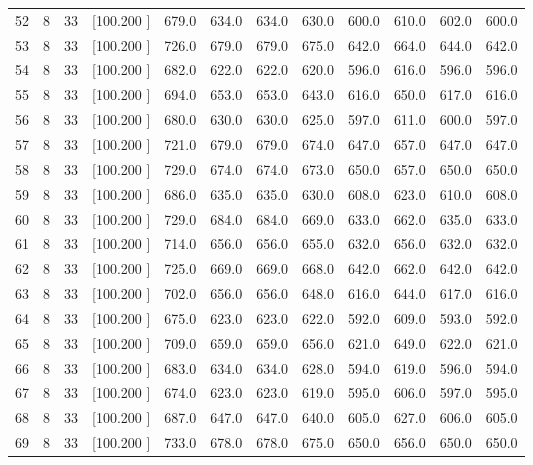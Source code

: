 \documentclass[12pt,a4paper]{article}
\begin{document}
\begin{center}
{\begin{tabular}{r r r r r r r r r r r r}
  52&  8& 33&[100.200   ]&   679.0&   634.0&   634.0&   630.0&   600.0&   610.0&   602.0&   600.0\\[-0.02in]
  53&  8& 33&[100.200   ]&   726.0&   679.0&   679.0&   675.0&   642.0&   664.0&   644.0&   642.0\\[-0.02in]
  54&  8& 33&[100.200   ]&   682.0&   622.0&   622.0&   620.0&   596.0&   616.0&   596.0&   596.0\\[-0.02in]
  55&  8& 33&[100.200   ]&   694.0&   653.0&   653.0&   643.0&   616.0&   650.0&   617.0&   616.0\\[-0.02in]
  56&  8& 33&[100.200   ]&   680.0&   630.0&   630.0&   625.0&   597.0&   611.0&   600.0&   597.0\\[-0.02in]
  57&  8& 33&[100.200   ]&   721.0&   679.0&   679.0&   674.0&   647.0&   657.0&   647.0&   647.0\\[-0.02in]
  58&  8& 33&[100.200   ]&   729.0&   674.0&   674.0&   673.0&   650.0&   657.0&   650.0&   650.0\\[-0.02in]
  59&  8& 33&[100.200   ]&   686.0&   635.0&   635.0&   630.0&   608.0&   623.0&   610.0&   608.0\\[-0.02in]
  60&  8& 33&[100.200   ]&   729.0&   684.0&   684.0&   669.0&   633.0&   662.0&   635.0&   633.0\\[-0.02in]
  61&  8& 33&[100.200   ]&   714.0&   656.0&   656.0&   655.0&   632.0&   656.0&   632.0&   632.0\\[-0.02in]
  62&  8& 33&[100.200   ]&   725.0&   669.0&   669.0&   668.0&   642.0&   662.0&   642.0&   642.0\\[-0.02in]
  63&  8& 33&[100.200   ]&   702.0&   656.0&   656.0&   648.0&   616.0&   644.0&   617.0&   616.0\\[-0.02in]
  64&  8& 33&[100.200   ]&   675.0&   623.0&   623.0&   622.0&   592.0&   609.0&   593.0&   592.0\\[-0.02in]
  65&  8& 33&[100.200   ]&   709.0&   659.0&   659.0&   656.0&   621.0&   649.0&   622.0&   621.0\\[-0.02in]
  66&  8& 33&[100.200   ]&   683.0&   634.0&   634.0&   628.0&   594.0&   619.0&   596.0&   594.0\\[-0.02in]
  67&  8& 33&[100.200   ]&   674.0&   623.0&   623.0&   619.0&   595.0&   606.0&   597.0&   595.0\\[-0.02in]
  68&  8& 33&[100.200   ]&   687.0&   647.0&   647.0&   640.0&   605.0&   627.0&   606.0&   605.0\\[-0.02in]
  69&  8& 33&[100.200   ]&   733.0&   678.0&   678.0&   675.0&   650.0&   656.0&   650.0&   650.0\\[-0.02in]

\end{tabular}}
\end{center}
\end{document}

